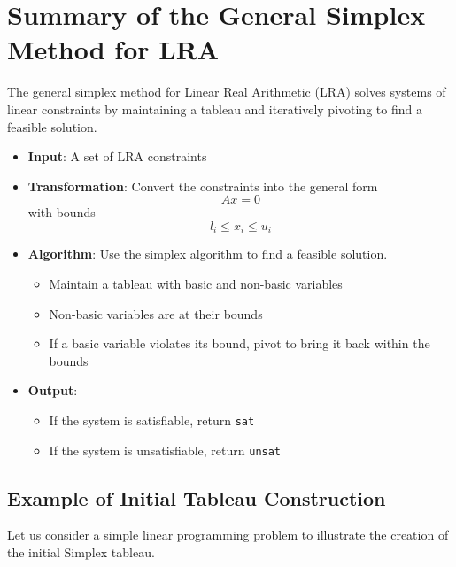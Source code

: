 \documentclass[11pt,a4paper]{article}
\theoremstyle{definition}
\theoremstyle{plain}
\theoremstyle{remark}
\begin{document}
\section{Summary of the General Simplex Method for LRA}

\begin{tcolorbox}[colback=blue!5!white,colframe=blue!75!black,title=\textbf{General Simplex Method for LRA}]
The general simplex method for Linear Real Arithmetic (LRA) solves systems of linear constraints by maintaining a tableau and iteratively pivoting to find a feasible solution.

\begin{itemize}
    \item \textbf{Input}: A set of LRA constraints
    \item \textbf{Transformation}: Convert the constraints into the general form 
    \[
        Ax = 0
    \]
    with bounds 
    \[
        l_i \leq x_i \leq u_i
    \]
    \item \textbf{Algorithm}: Use the simplex algorithm to find a feasible solution.
    \begin{itemize}
        \item Maintain a tableau with basic and non-basic variables
        \item Non-basic variables are at their bounds
        \item If a basic variable violates its bound, pivot to bring it back within the bounds
    \end{itemize}
    \item \textbf{Output}: 
    \begin{itemize}
        \item If the system is satisfiable, return \texttt{sat}
        \item If the system is unsatisfiable, return \texttt{unsat}
    \end{itemize}
\end{itemize}
\end{tcolorbox}

\subsection{Example of Initial Tableau Construction}

Let us consider a simple linear programming problem to illustrate the creation of the initial Simplex tableau.
    
\end{document}
